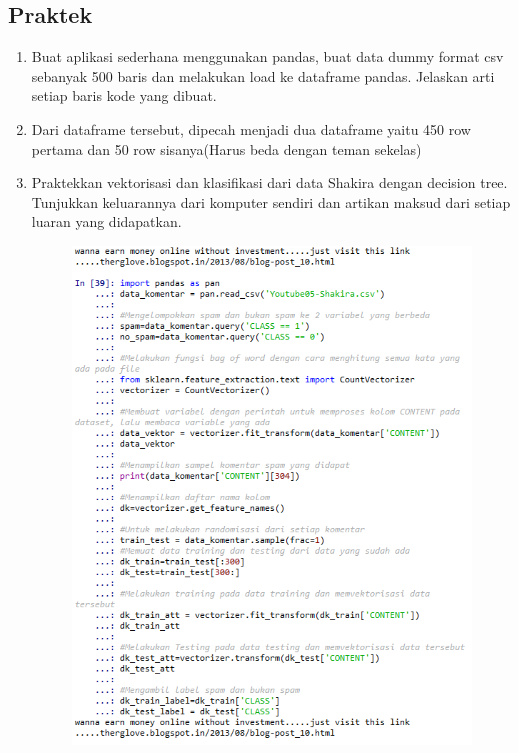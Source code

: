 \subsection{Praktek}
\begin{enumerate}
    \item Buat aplikasi sederhana menggunakan pandas, buat data dummy format csv sebanyak 500 baris dan melakukan load ke dataframe pandas. Jelaskan arti setiap baris kode yang dibuat.
    
    \item Dari dataframe tersebut, dipecah menjadi dua dataframe yaitu 450 row pertama dan 50 row sisanya(Harus beda dengan teman sekelas)
    
    \item Praktekkan vektorisasi dan klasifikasi dari data Shakira dengan decision tree. Tunjukkan keluarannya dari komputer sendiri dan artikan maksud dari setiap luaran yang didapatkan.
    
    \begin{figure}[ht]
        \centering
        \includegraphics[scale=0.2]{figures/1174035/chapter4/3_praktek.png}

\end{figure}
\end{enumerate}
